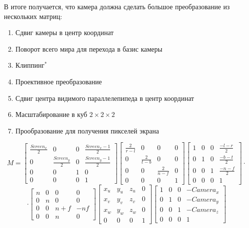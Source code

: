 \documentclass{article}
\begin{document}
В итоге получается, что камера должна сделать большое преобразование из нескольких матриц:

\begin{enumerate}
	\item Сдвиг камеры в центр координат
	\item Поворот всего мира для перехода в базис камеры
	\item Клиппинг$^*$
	\item Проективное преобразование
	\item Сдвиг центра видимого параллелепипеда в центр координат
	\item Масштабирование в куб $2 \times 2 \times 2$
	\item Прообразование для получения пикселей экрана
\end{enumerate}

$$ M = \begin{bmatrix}\frac{Screen_x}{2} & 0 & 0 & \frac{Screen_x - 1}{2} \\ 
					  0 & \frac{Screen_y}{2} & 0 & \frac{Screen_y - 1}{2} \\
					  0 & 0 & 1 & 0 \\
					  0 & 0 & 0 & 1\end{bmatrix}\begin{bmatrix}
					  \frac{2}{r - l} & 0 & 0 & 0 \\ 
					  0 & \frac{2}{t - b} & 0 & 0 \\
					  0 & 0 & \frac{2}{n - f} & 0 \\
					  0 & 0 & 0 & 1\end{bmatrix}\begin{bmatrix}
					  1 & 0 & 0 & \frac{-l - r}{2} \\ 
					  0 & 1 & 0 & \frac{-b - t}{2} \\
					  0 & 0 & 1 & \frac{-n - f}{2} \\
					  0 & 0 & 0 & 1\end{bmatrix} \cdot $$$$\cdot \begin{bmatrix}
					  n & 0 & 0 & 0 \\
					  0 & n & 0 & 0 \\
					  0 & 0 & n + f & -nf \\
					  0 & 0 & n & 0
					  \end{bmatrix}\begin{bmatrix}
					  x_u & y_u & z_u & 0 \\
					  x_v & y_v & z_v & 0 \\
					  x_w & y_w & z_w & 0 \\
					  0 & 0 & 0 & 1
					  \end{bmatrix}\begin{bmatrix}
					  1 & 0 & 0 & -Camera_x \\
					  0 & 1 & 0 & -Camera_y \\
					  0 & 0 & 1 & -Camera_z \\
					  0 & 0 & 0 & 1
					  \end{bmatrix}$$
\end{document}
